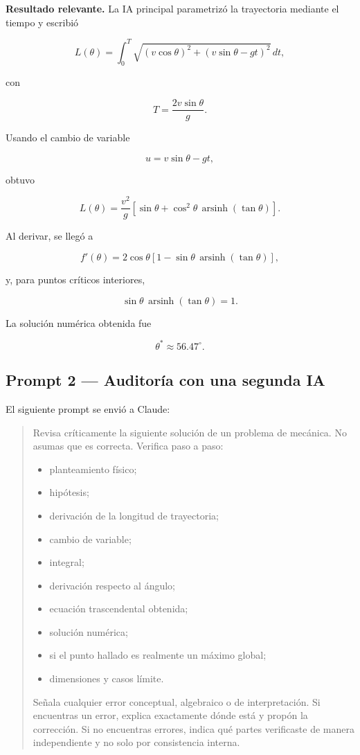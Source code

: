 \textbf{Resultado relevante.} La IA principal parametrizó la trayectoria mediante el tiempo y escribió

\[
L(\theta)
=
\int_0^T
\sqrt{
(v\cos\theta)^2+
(v\sin\theta-gt)^2
}\,dt,
\]

con

\[
T=\frac{2v\sin\theta}{g}.
\]

Usando el cambio de variable

\[
u=v\sin\theta-gt,
\]

obtuvo

\[
L(\theta)
=
\frac{v^2}{g}
\left[
\sin\theta+
\cos^2\theta\,
\operatorname{arsinh}(\tan\theta)
\right].
\]

Al derivar, se llegó a

\[
f'(\theta)
=
2\cos\theta
\left[
1-\sin\theta\,\operatorname{arsinh}(\tan\theta)
\right],
\]

y, para puntos críticos interiores,

\[
\sin\theta\,\operatorname{arsinh}(\tan\theta)=1.
\]

La solución numérica obtenida fue

\[
\theta^*\approx 56.47^\circ.
\]

\subsection*{Prompt 2 --- Auditoría con una segunda IA}

El siguiente prompt se envió a Claude:

\begin{quote}
Revisa críticamente la siguiente solución de un problema de mecánica. No asumas que es correcta. Verifica paso a paso:

\begin{itemize}
    \item planteamiento físico;
    \item hipótesis;
    \item derivación de la longitud de trayectoria;
    \item cambio de variable;
    \item integral;
    \item derivación respecto al ángulo;
    \item ecuación trascendental obtenida;
    \item solución numérica;
    \item si el punto hallado es realmente un máximo global;
    \item dimensiones y casos límite.
\end{itemize}

Señala cualquier error conceptual, algebraico o de interpretación. Si encuentras un error, explica exactamente dónde está y propón la corrección. Si no encuentras errores, indica qué partes verificaste de manera independiente y no solo por consistencia interna.
\end{quote}

